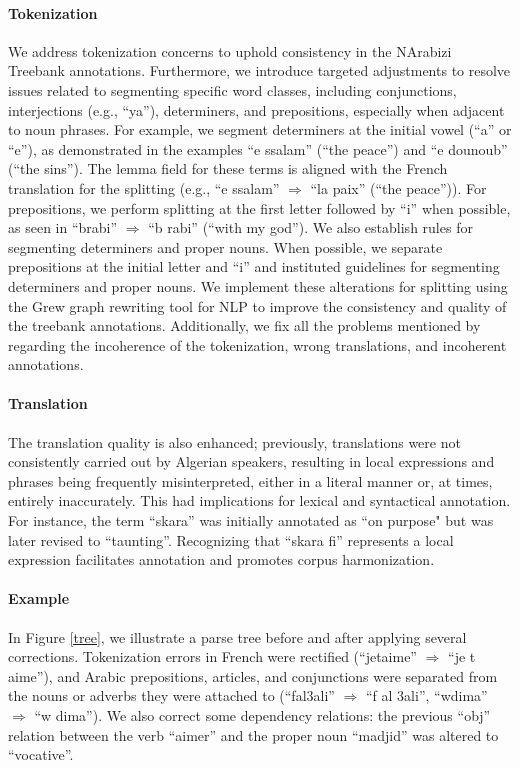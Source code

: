 \documentclass[11pt]{article}
\begin{document}
\paragraph{Tokenization} We address tokenization concerns to uphold consistency in the NArabizi Treebank annotations. Furthermore, we introduce targeted adjustments to resolve issues related to segmenting specific word classes, including conjunctions, interjections (e.g., ``ya''), determiners, and prepositions, especially when adjacent to noun phrases. For example, we segment determiners at the initial vowel (``a'' or ``e''), as demonstrated in the examples ``e ssalam'' (``the peace'') and ``e dounoub'' (``the sins''). The lemma field for these terms is aligned with the French translation for the splitting (e.g., ``e ssalam'' $\Rightarrow$ ``la paix'' (``the peace'')). For prepositions, we perform splitting at the first letter followed by ``i'' when possible, as seen in ``brabi'' $\Rightarrow$ ``b rabi'' (``with my god''). We also establish rules for segmenting determiners and proper nouns. When possible, we separate prepositions at the initial letter and ``i'' and instituted guidelines for segmenting determiners and proper nouns. We implement these alterations for splitting using the Grew graph rewriting tool for NLP \cite{guillaume2021graph} to improve the consistency and quality of the treebank annotations. Additionally, we fix all the problems mentioned by \citet{touileb-barnes-2021-interplay} regarding the incoherence of the tokenization, wrong translations, and incoherent annotations.

\paragraph{Translation} The translation quality is also enhanced; previously, translations were not consistently carried out by Algerian speakers, resulting in local expressions and phrases being frequently misinterpreted, either in a literal manner or, at times, entirely inaccurately. This had implications for lexical and syntactical annotation. For instance, the term ``skara'' was initially annotated as ``on purpose" but was later revised to ``taunting''. Recognizing that ``skara fi'' represents a local expression facilitates annotation and promotes corpus harmonization.

\paragraph{Example} In Figure \ref{tree}, we illustrate a parse tree before and after applying several corrections. Tokenization errors in French were rectified (``jetaime'' $\Rightarrow$ ``je t aime''), and Arabic prepositions, articles, and conjunctions were separated from the nouns or adverbs they were attached to (``fal3ali'' $\Rightarrow$ ``f al 3ali'', ``wdima'' $\Rightarrow$ ``w dima''). We also correct some dependency relations: the previous ``obj'' relation between the verb ``aimer'' and the proper noun ``madjid'' was altered to ``vocative''. 
\end{document}
